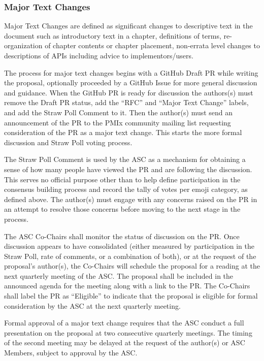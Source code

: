 \documentclass{article}
\begin{document}
\hypertarget{major-text-changes}{%
\subsubsection{Major Text Changes}%
\label{major-text-changes}}

Major Text Changes are defined as significant changes to descriptive text in
the document such as introductory text in a chapter, definitions of terms,
re-organization of chapter contents or chapter placement, non-errata level
changes to descriptions of APIs including advice to implementors/users.

The process for major text changes begins with a GitHub Draft PR while writing the proposal, optionally proceeded by a GitHub Issue for more general discussion and guidance.
When the GitHub PR is ready for discussion the authors(s) must remove the Draft PR status, add the ``RFC'' and ``Major Text Change'' labels, and add the Straw Poll Comment to it.
Then the author(s) must send an announcement of the PR to the PMIx community mailing list requesting consideration of the PR as a major text change.
This starts the more formal discussion and Straw Poll voting process.

The Straw Poll Comment is used by the ASC as a mechanism for
obtaining a sense of how many people have viewed the PR and are
following the discussion. This serves no official purpose other than to
help define participation in the consensus building process and record
the tally of votes per emoji category, as defined above.
The author(s) must engage with any concerns raised on the PR in an attempt to
resolve those concerns before moving to the next stage in the process.

The ASC Co-Chairs shall monitor the status of discussion on the PR. Once
discussion appears to have consolidated (either measured by
participation in the Straw Poll, rate of comments, or a combination of
both), or at the request of the proposal's author(s), the Co-Chairs will
schedule the proposal for a reading at the next quarterly meeting of the
ASC. The proposal shall be included in the announced agenda for the
meeting along with a link to the PR.
The Co-Chairs shall label the PR as ``Eligible'' to indicate that the proposal is
eligible for formal consideration by the ASC at the next quarterly meeting.

Formal approval of a major text change requires that the ASC conduct a full
presentation on the proposal at two consecutive quarterly meetings. The
timing of the second meeting may be delayed at the request of the
author(s) or ASC Members, subject to approval by the ASC.
\end{document}
